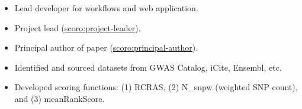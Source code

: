 \begin{itemize}[topsep=0pt,itemsep=0pt,partopsep=0pt,parsep=0pt]
    \item Lead developer for workflows and web application.
    \item Project lead (\href{http://purl.org/spar/scoro/project-leader}{scoro:project-leader}).
    \item Principal author of paper (\href{http://purl.org/spar/scoro/principal-author}{scoro:principal-author}).
    \item Identified and sourced datasets from GWAS Catalog, iCite, Ensembl, etc.
    \item Developed scoring functions: (1) RCRAS, (2) N\_snpw (weighted SNP count), and (3) meanRankScore.
\end{itemize}

